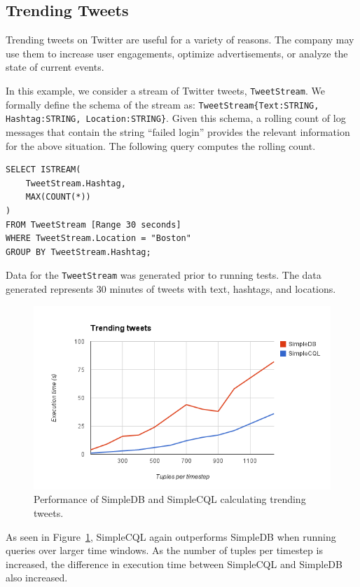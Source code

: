 \documentclass[a4paper, 10pt, conference]{IEEEconf}
\begin{document}
\subsection{Trending Tweets}
Trending tweets on Twitter are useful for a variety of reasons.  The company may use them to increase user engagements, optimize advertisements, or analyze the state of current events.  

In this example, we consider a stream of Twitter tweets, \texttt{TweetStream}. We formally define the schema of the stream as: \texttt{TweetStream\{Text:STRING, Hashtag:STRING, Location:STRING\}}.  Given this schema, a rolling count of log messages that contain the string ``failed login'' provides the relevant information for the above situation.  The following query computes the rolling count.

\begin{lstlisting}
SELECT ISTREAM(
    TweetStream.Hashtag,
    MAX(COUNT(*))
)
FROM TweetStream [Range 30 seconds]
WHERE TweetStream.Location = "Boston"
GROUP BY TweetStream.Hashtag;
\end{lstlisting}

Data for the \texttt{TweetStream} was generated prior to running tests.  The data generated represents 30 minutes of tweets with text, hashtags, and locations.   

\begin{figure}[h!]
    \centering
    \centerline{\includegraphics[totalheight=5cm]{trending.png}}
    \caption{Performance of SimpleDB and SimpleCQL calculating trending tweets.}
    \label{fig:trending}
\end{figure}

As seen in Figure~\ref{fig:trending}, SimpleCQL again outperforms SimpleDB when running queries over larger time windows.  As the number of tuples per timestep is increased, the difference in execution time between SimpleCQL and SimpleDB also increased.
\end{document}

